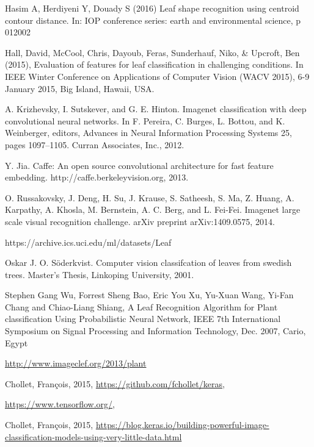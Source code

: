 \documentclass[journal, 10pt]{IEEEtran}
\begin{document}
\begin{thebibliography}{1}
    Hasim A, Herdiyeni Y, Douady S (2016) Leaf shape recognition using centroid contour distance. In: IOP conference series: earth and environmental science, p 012002

    Hall, David, McCool, Chris, Dayoub, Feras, Sunderhauf, Niko, \& Upcroft, Ben (2015), Evaluation of features for leaf classification in challenging conditions. In IEEE Winter Conference on Applications of Computer Vision (WACV 2015), 6-9 January 2015, Big Island, Hawaii, USA.


    A. Krizhevsky, I. Sutskever, and G. E. Hinton. Imagenet classification with deep convolutional neural networks. In F. Pereira, C. Burges, L. Bottou, and K. Weinberger, editors, Advances in Neural Information Processing Systems 25, pages 1097–1105. Curran Associates, Inc., 2012.

    Y. Jia. Caffe: An open source convolutional architecture for fast feature embedding. http://caffe.berkeleyvision.org, 2013.

    O. Russakovsky, J. Deng, H. Su, J. Krause, S. Satheesh, S. Ma, Z. Huang, A. Karpathy, A. Khosla, M. Bernstein, A. C. Berg, and L. Fei-Fei. Imagenet large scale visual recognition challenge. arXiv preprint arXiv:1409.0575, 2014.

    https://archive.ics.uci.edu/ml/datasets/Leaf

    Oskar J. O. Söderkvist. Computer vision classifcation of leaves from swedish trees. Master's Thesis, Linkoping University, 2001.

    Stephen Gang Wu, Forrest Sheng Bao, Eric You Xu, Yu-Xuan Wang, Yi-Fan Chang and Chiao-Liang Shiang, A Leaf Recognition Algorithm for Plant classification Using Probabilistic Neural Network, IEEE 7th International Symposium on Signal Processing and Information Technology, Dec. 2007, Cario, Egypt

    \url{http://www.imageclef.org/2013/plant}

    Chollet, Fran\c{c}ois, 2015, \url{https://github.com/fchollet/keras},

    \url{https://www.tensorflow.org/},

    Chollet, Fran\c{c}ois, 2015, \url{https://blog.keras.io/building-powerful-image-classification-models-using-very-little-data.html}


\end{thebibliography}
\end{document}
